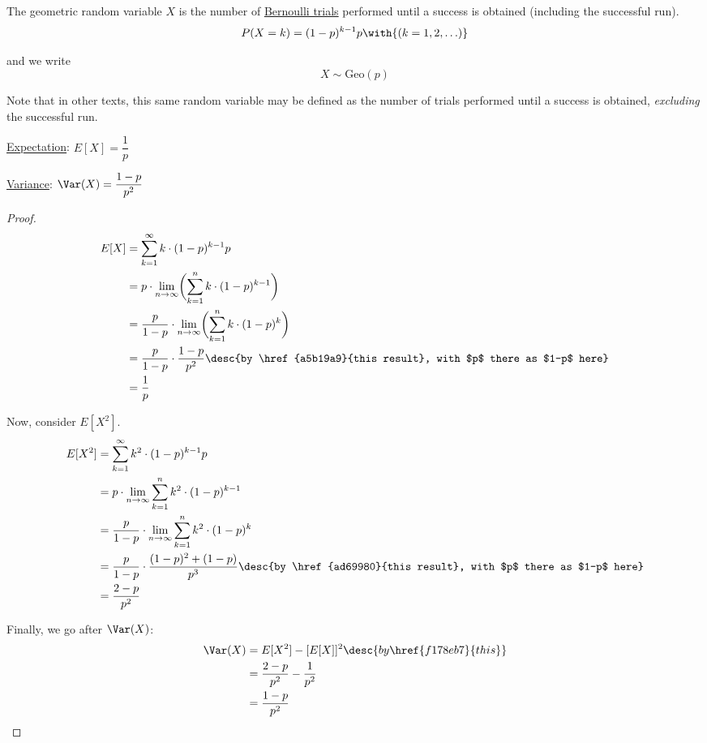 \label{ba79d2b}

The geometric random variable $X$ is the number of \href{e2d50c6}{Bernoulli
trials} performed until a success is obtained (including the successful run).
$$
  P(X=k)=(1-p)^{k-1}p\with{(k=1,2,\ldots)}
$$

and we write
$$
  X\sim\mathrm{Geo}(p)
$$

Note that in other texts, this same random variable may be defined as the
number of trials performed until a success is obtained, \textit{excluding} the
successful run.

\label{babfacb}

\begin{enumerati}
  \item\href{ecb2162}{Expectation}: $E[X]=\dfrac1p$
  \item\href{ddd95d5}{Variance}: $\Var(X)=\dfrac{1-p}{p^2}$
\end{enumerati}

\begin{proof}
  \begin{align*}
    E[X] &=\sum_{k=1}^\infty k\cdot(1-p)^{k-1}p                                                                \\
         &=p\cdot\lim_{n\to\infty}\biggl(\sum_{k=1}^nk\cdot(1-p)^{k-1}\biggr)                                  \\
         &=\frac p{1-p}\cdot\lim_{n\to\infty}\biggl(\sum_{k=1}^nk\cdot(1-p)^k\biggr)                           \\
         &=\frac p{1-p}\cdot\frac{1-p}{p^2}\desc{by \href{a5b19a9}{this result}, with $p$ there as $1-p$ here} \\
         &=\frac1p
  \end{align*}

  Now, consider $E[X^2]$.
  \begin{align*}
    E[X^2] &=\sum_{k=1}^\infty k^2\cdot(1-p)^{k-1}p                                                                        \\
           &=p\cdot\lim_{n\to\infty}\sum_{k=1}^nk^2\cdot(1-p)^{k-1}                                                        \\
           &=\frac p{1-p}\cdot\lim_{n\to\infty}\sum_{k=1}^nk^2\cdot(1-p)^k                                                 \\
           &=\frac p{1-p}\cdot\frac{(1-p)^2+(1-p)}{p^3}\desc{by \href{ad69980}{this result}, with $p$ there as $1-p$ here} \\
           &=\frac{2-p}{p^2}
  \end{align*}

  Finally, we go after $\Var(X)$:
  \begin{align*}
    \Var(X) &=E[X^2]-[E[X]]^2\desc{by \href{f178eb7}{this}} \\
            &=\frac{2-p}{p^2}-\frac1{p^2}                   \\
            &=\frac{1-p}{p^2}
  \end{align*}
\end{proof}

